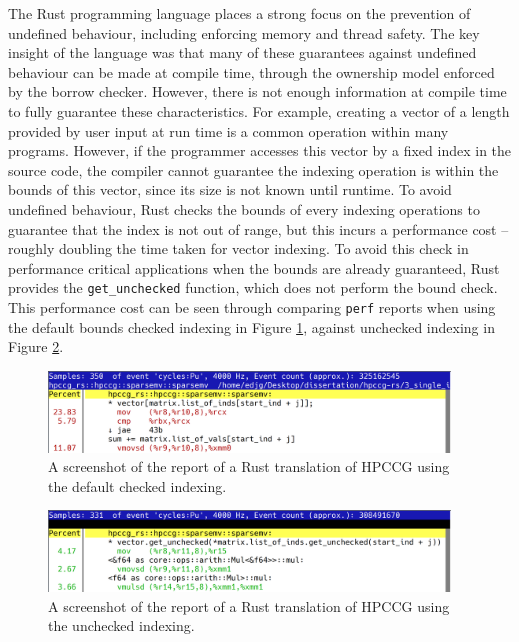 The Rust programming language places a strong focus on the prevention of undefined behaviour, including enforcing memory and thread safety. The key insight of the language was that many of these guarantees against undefined behaviour can be made at compile time, through the ownership model enforced by the borrow checker. However, there is not enough information at compile time to fully guarantee these characteristics. For example, creating a vector of a length provided by user input at run time is a common operation within many programs. However, if the programmer accesses this vector by a fixed index in the source code, the compiler cannot guarantee the indexing operation is within the bounds of this vector, since its size is not known until runtime. To avoid undefined behaviour, Rust checks the bounds of every indexing operations to guarantee that the index is not out of range, but this incurs a performance cost -- roughly doubling the time taken for vector indexing. To avoid this check in performance critical applications when the bounds are already guaranteed, Rust provides the \texttt{get_unchecked} function, which does not perform the bound check. This performance cost can be seen through comparing \texttt{perf} reports when using the default bounds checked indexing in Figure \ref{fig:perf-checked}, against unchecked indexing in Figure \ref{fig:perf-unchecked}.

\begin{figure}[H]
    \centering
    \includegraphics[width=0.95\textwidth]{images/5_performance/perf/perf_checked_op.png}
    \caption{A screenshot of the  report of a Rust translation of HPCCG using the default checked indexing.}
    \label{fig:perf-checked}
\end{figure}

\begin{figure}[H]
    \centering
    \includegraphics[width=0.95\textwidth]{images/5_performance/perf/perf_unchecked_op.png}
    \caption{A screenshot of the  report of a Rust translation of HPCCG using the unchecked indexing.}
    \label{fig:perf-unchecked}
\end{figure}

